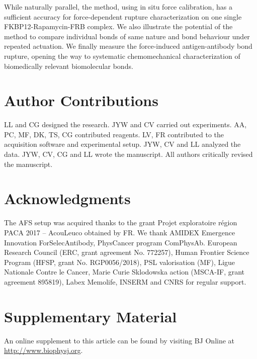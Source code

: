 \documentclass{biophys-new}
\begin{document}
While naturally parallel, the method, using in situ force calibration, has a sufficient accuracy for force-dependent rupture characterization on one single FKBP12-Rapamycin-FRB complex. We also illustrate the potential of the method to compare individual bonds of same nature and bond behaviour under repeated actuation. We finally measure the force-induced antigen-antibody bond rupture, opening the way to systematic chemomechanical characterization of biomedically relevant biomolecular bonds.

\section*{Author Contributions}

LL and CG designed the research. JYW and CV carried out experiments. AA, PC, MF, DK, TS, CG contributed reagents. LV, FR contributed to the acquisition software and experimental setup. JYW, CV and LL analyzed the data. JYW, CV, CG and LL wrote the manuscript. All authors critically revised the manuscript.

\section*{Acknowledgments}

The AFS setup was acquired thanks to the grant Projet exploratoire région PACA 2017 – AcouLeuco obtained by FR. We thank AMIDEX Emergence Innovation ForSelecAntibody, PhysCancer program ComPhysAb. European Research Council (ERC, grant agreement No. 772257), Human Frontier Science Program (HFSP, grant No. RGP0056/2018), PSL valorisation (MF), Ligue Nationale Contre le Cancer,  Marie Curie Sklodowska action (MSCA-IF, grant agreement 895819), Labex Memolife, INSERM and CNRS for regular support.





\newpage

\FloatBarrier

\newpage

\section*{Supplementary Material}

An online supplement to this article can be found by visiting BJ Online at \url{http://www.biophysj.org}.
\end{document}
